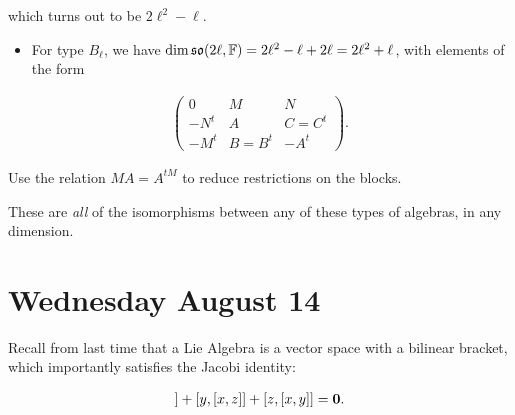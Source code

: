 which turns out to be \(2\ell^{2}-\ell\).

\begin{itemize}
\tightlist
\item
  For type \(B_{\ell}\), we have
  \(\dim{{\mathfrak{so}}}(2\ell, {\mathbb{F}}) = 2\ell^{2} -\ell+2\ell = 2\ell^{2} + \ell\),
  with elements of the form
\end{itemize}

\begin{align*}
\left(\begin{array}{c|cc}
0 & M & N \\ \hline
-N^{t} & A & C=C^{t} \\
-M^{t} & B=B^{t} & -A^{t}
\end{array}\right)
.\end{align*}


Use the relation \(MA = A^{tM}\) to reduce restrictions on the blocks.



These are \emph{all} of the isomorphisms between any of these types of
algebras, in any dimension. 

\hypertarget{wednesday-august-14}{%
\section{Wednesday August 14}\label{wednesday-august-14}}

Recall from last time that a Lie Algebra is a vector space with a
bilinear bracket, which importantly satisfies the Jacobi identity:

\begin{align*}
[x, [y, z]] + [y, [x,z]] + [z, [x, y]] = \vector 0
.\end{align*}

